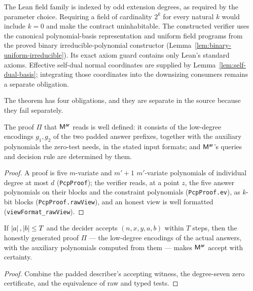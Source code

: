 The Lean field family is indexed by odd extension degrees, as required by the parameter
choice. Requiring a field of cardinality $2^k$ for every natural $k$ would include $k=0$
and make the contract uninhabitable. The constructed verifier uses the canonical
polynomial-basis representation and uniform field programs from the proved binary
irreducible-polynomial constructor (Lemma~\ref{lem:binary-uniform-irreducible}).
Its exact axiom guard contains only Lean's standard axioms. Effective self-dual
normal coordinates are supplied by Lemma~\ref{lem:self-dual-basis}; integrating
those coordinates into the downsizing consumers remains a separate obligation.

The theorem has four obligations, and they are separate in the source because they fail
separately.

\effortMedium

\begin{lemma}
\label{lem:pcp-format}
\leanok
The proof $\Pi$ that $\mathsf{M}^{\mathsf{ar}}$ reads is well defined: it consists of the low-degree
encodings $g_1, g_2$ of the two padded answer prefixes, together with the auxiliary
polynomials the zero-test needs, in the stated input formats; and $\mathsf{M}^{\mathsf{ar}}$'s queries and
decision rule are determined by them.
\end{lemma}

\begin{proof}
\leanok
A proof is five $m$-variate and $m'+1$ $m'$-variate polynomials of individual degree at most
$d$ (\texttt{PcpProof}); the verifier reads, at a point $z$, the five answer polynomials on
their blocks and the constraint polynomials (\texttt{PcpProof.ev}), as $k$-bit blocks
(\texttt{PcpProof.rawView}), and an honest view is well formatted
(\texttt{viewFormat\_rawView}).
\end{proof}

\effortMedium

\begin{lemma}
\label{lem:pcp-completeness}
\leanok
If $\left\vert {a} \right\vert,\left\vert {b} \right\vert\leq T$ and the decider accepts $(n, x, y, a, b)$ within $T$ steps,
then the honestly generated proof
$\Pi$ --- the low-degree encodings of the actual answers, with the auxiliary polynomials
computed from them --- makes $\mathsf{M}^{\mathsf{ar}}$ accept with certainty.
\end{lemma}
\begin{proof}
\leanok
Combine the padded describer's accepting witness, the degree-seven zero certificate,
and the equivalence of raw and typed tests.
\end{proof}

